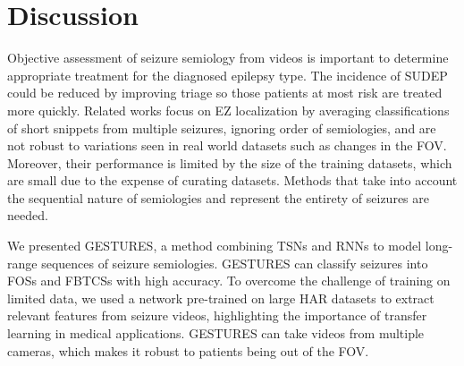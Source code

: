 \section{Discussion}
\label{sec:videos_discussion}

Objective assessment of seizure semiology from videos is important to determine appropriate treatment for the diagnosed epilepsy type.
The incidence of \ac{SUDEP} could be reduced by improving triage so those patients at most risk are treated more quickly.
Related works focus on \ac{EZ} localization by averaging classifications of short snippets from multiple seizures, ignoring order of semiologies, and are not robust to variations seen in real world datasets such as changes in the \ac{FOV}.
Moreover, their performance is limited by the size of the training datasets, which are small due to the expense of curating datasets.
Methods that take into account the sequential nature of semiologies and represent the entirety of seizures are needed.


We presented \ac{GESTURES}, a method combining \acp{TSN} and \acp{RNN} to model long-range sequences of seizure semiologies.
\ac{GESTURES} can classify seizures into \acp{FOS} and \acp{FBTCS} with high accuracy.
To overcome the challenge of training on limited data, we used a network pre-trained on large \ac{HAR} datasets to extract relevant features from seizure videos, highlighting the importance of transfer learning in medical applications.
\ac{GESTURES} can take videos from multiple cameras, which makes it robust to patients being out of the \ac{FOV}.



